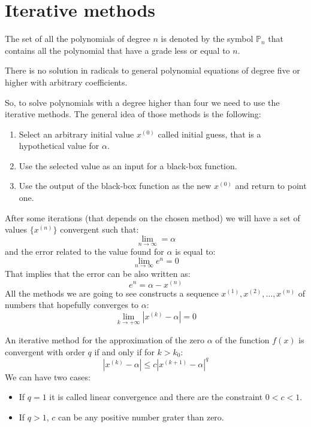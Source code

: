 \documentclass[12pt, a4paper]{report}
\newtheorem[style=M,bodystyle=\normalfont]{theorem}{Theorem}
\newtheorem[style=M,bodystyle=\normalfont]{proposition}{Proposition}
\newtheorem[style=M,bodystyle=\normalfont]{corollary}{Corollary}
\newtheorem[style=M,bodystyle=\normalfont]{lemma}{Lemma}
\newtheorem[style=M,bodystyle=\normalfont]{definition}{Definition}
\begin{document}
    \section{Iterative methods}
    The set of all the polynomials of degree $n$ is denoted by the symbol $\mathbb{P}_n$ that contains all the polynomial that have a grade less or equal to $n$.
    \begin{theorem}
        There is no solution in radicals to general polynomial equations of degree five or higher with arbitrary coefficients. 
    \end{theorem}
    So, to solve polynomials with a degree higher than four we need to use the iterative methods. The general idea of those methods is the following:
    \begin{enumerate}
        \item Select an arbitrary initial value $x^{(0)}$ called initial guess, that is a hypothetical value for $\alpha$.
        \item Use the selected value as an input for a black-box function.
        \item Use the output of the black-box function as the new $x^{(0)}$ and return to point one. 
    \end{enumerate}
    After some iterations (that depends on the chosen method) we will have a set of values $\{ x^{(n)} \}$ convergent such that:
    \[ \lim_{n \rightarrow \infty} = \alpha\]
    and the error related to the value found for $\alpha$ is equal to: 
    \[ \lim_{n \rightarrow \infty}e^n = 0\]
    That implies that the error can be also written as: 
    \[e^n=\alpha-x^{(n)}\]
    All the methods we are going to see constructs a sequence $x^{(1)},x^{(2)},\dots,x^{(n)}$ of numbers that hopefully converges to $\alpha$:
    \[ \lim_{k \rightarrow + \infty} \left\lvert x^{(k)}-\alpha \right\rvert =0\]
    \begin{definition}
        An iterative method for the approximation of the zero $\alpha$ of the function $f(x)$ is convergent with order $q$ if and only if for $k > k_0$:
        \[\left\lvert x^{(k)} - \alpha \right\rvert \leq c {\left\lvert x^{(k+1)} - \alpha \right\rvert}^q  \]
        We can have two cases:
        \begin{itemize}
            \item If $q=1$ it is called linear convergence and there are the constraint $0<c<1$.
            \item If $q>1$, $c$ can be any positive number grater than zero. 
        \end{itemize}
    \end{definition}
\end{document}
